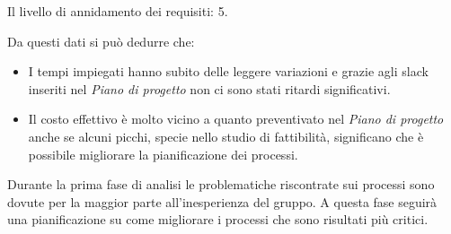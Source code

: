 \documentclass[a4paper]{article}
\begin{document}
				Il livello di annidamento dei requisiti: 5.
					
				Da questi dati si può dedurre che:
					\begin{itemize}
						\item I tempi impiegati hanno subito delle leggere variazioni e grazie agli slack inseriti nel 
						\emph{Piano di progetto} non ci sono stati ritardi significativi.
						\item Il costo effettivo è molto vicino a quanto preventivato nel \emph{Piano di progetto} anche se 
						alcuni picchi, specie nello studio di fattibilità, significano che è possibile migliorare la 
						pianificazione dei processi.
					\end{itemize}
			
				Durante la prima fase di analisi le problematiche riscontrate sui processi sono dovute per la maggior parte 
				all'inesperienza del gruppo. A questa fase seguirà una pianificazione su come migliorare i processi che sono 
				risultati più critici.
				
\end{document}
